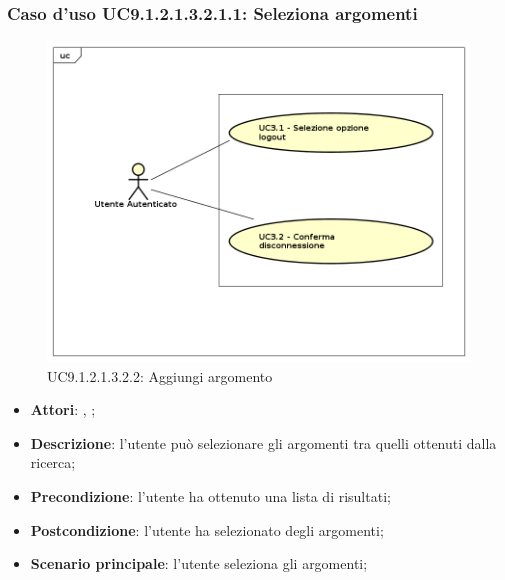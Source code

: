 								\subsubsection{Caso d'uso UC9.1.2.1.3.2.1.1: Seleziona argomenti}
								\label{UC9.1.2.1.3.2.2}
								\begin{figure}[h]
									\centering
									\includegraphics[scale=0.7,keepaspectratio]{UML/UC9.png}
									\caption{UC9.1.2.1.3.2.2: Aggiungi argomento}
								\end{figure}
								\FloatBarrier
								\begin{itemize}
									\item \textbf{Attori}: \uau, \uaupro;
									\item \textbf{Descrizione}: l'utente può selezionare gli argomenti tra quelli ottenuti dalla ricerca;
									\item \textbf{Precondizione}: l'utente ha ottenuto una lista di risultati;
									\item \textbf{Postcondizione}: l'utente ha selezionato degli argomenti; 
									\item \textbf{Scenario principale}: l'utente seleziona gli argomenti;
								\end{itemize}
						
